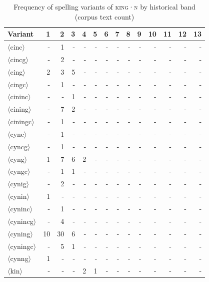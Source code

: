 \documentclass[doc,biblatex]{apa7}
\newcommand\lemma[2]{\textsc{#1·#2}}
\newcommand\spelling[1]{\allowbreak$\langle$#1$\rangle$}
\begin{document}
	\begin{table}
	\begin{center}
	\begin{threeparttable}
	\caption{Frequency of spelling variants of \lemma{king}{n} by historical band (corpus text count)}
	\footnotesize
	\begin{tabular}{lrrrrrrrrrrrrr}
	\toprule
	Variant & 1 & 2 & 3 & 4 & 5 & 6 & 7 & 8 & 9 & 10 & 11 & 12 & 13 \\
	\midrule
	\spelling{cinc} & - & 1 & - & - & - & - & - & - & - & - & - & - & - \\
	\spelling{cincg} & - & 2 & - & - & - & - & - & - & - & - & - & - & - \\
	\spelling{cing} & 2 & 3 & 5 & - & - & - & - & - & - & - & - & - & - \\
	\spelling{cingc} & - & 1 & - & - & - & - & - & - & - & - & - & - & - \\
	\spelling{cininc} & - & - & 1 & - & - & - & - & - & - & - & - & - & - \\
	\spelling{cining} & - & 7 & 2 & - & - & - & - & - & - & - & - & - & - \\
	\spelling{ciningc} & - & 1 & - & - & - & - & - & - & - & - & - & - & - \\
	\spelling{cync} & - & 1 & - & - & - & - & - & - & - & - & - & - & - \\
	\spelling{cyncg} & - & 1 & - & - & - & - & - & - & - & - & - & - & - \\
	\spelling{cyng} & 1 & 7 & 6 & 2 & - & - & - & - & - & - & - & - & - \\
	\spelling{cyngc} & - & 1 & 1 & - & - & - & - & - & - & - & - & - & - \\
	\spelling{cynig} & - & 2 & - & - & - & - & - & - & - & - & - & - & - \\
	\spelling{cynin} & 1 & - & - & - & - & - & - & - & - & - & - & - & - \\
	\spelling{cyninc} & - & 1 & - & - & - & - & - & - & - & - & - & - & - \\
	\spelling{cynincg} & - & 4 & - & - & - & - & - & - & - & - & - & - & - \\
	\spelling{cyning} & 10 & 30 & 6 & - & - & - & - & - & - & - & - & - & - \\
	\spelling{cyningc} & - & 5 & 1 & - & - & - & - & - & - & - & - & - & - \\
	\spelling{cynng} & 1 & - & - & - & - & - & - & - & - & - & - & - & - \\
	\spelling{kin} & - & - & - & 2 & 1 & - & - & - & - & - & - & - & - \\

\end{tabular}
\end{threeparttable}
\end{center}
\end{table}
\end{document}
